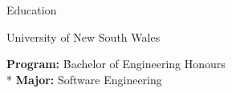 \documentclass{article}
\newlength{\tabin}
\newlength{\secsep}
\newcommand{\lineunder}{\vspace*{-8pt} \\ \hspace*{-6pt} \hrulefill \\ \vspace*{-15pt}}
\newenvironment{tabbedsection}[1]{
  \begin{list}{}{
      \setlength{\itemsep}{0pt}
      \setlength{\labelsep}{0pt}
      \setlength{\labelwidth}{0pt}
      \setlength{\leftmargin}{\tabin}
      \setlength{\rightmargin}{\tabin}
      \setlength{\listparindent}{0pt}
      \setlength{\parsep}{0pt}
      \setlength{\parskip}{0pt}
      \setlength{\partopsep}{0pt}
      \setlength{\topsep}{#1}
    }
  \item[]
}{\end{list}}
\newenvironment{nospacetabbing}{
    \begin{tabbing}
}{\end{tabbing}\vspace{-1.2em}}
\newenvironment{resume_section}[1]{
  \filbreak
  \vspace{2\secsep}
  \textsc{\large#1}
  \lineunder
  \begin{tabbedsection}{\secsep}
}{\end{tabbedsection}}
\newenvironment{resume_subsection}[2][]{
  \textbf{#2} \hfill {\footnotesize #1} \hspace{-5.1em}
  \begin{tabbedsection}{0.5\secsep}
}{\end{tabbedsection}}
\begin{document}
%
\begin{resume_section}{Education}
  \begin{resume_subsection}[09/2023 - Present]{University of New South Wales}
    \begin{nospacetabbing}
      \textbf{Program:} \= Bachelor of Engineering Honours \\*
      \textbf{Major:} \> Software Engineering
    \end{nospacetabbing}
  \end{resume_subsection}
\end{resume_section}




  
\end{document}
